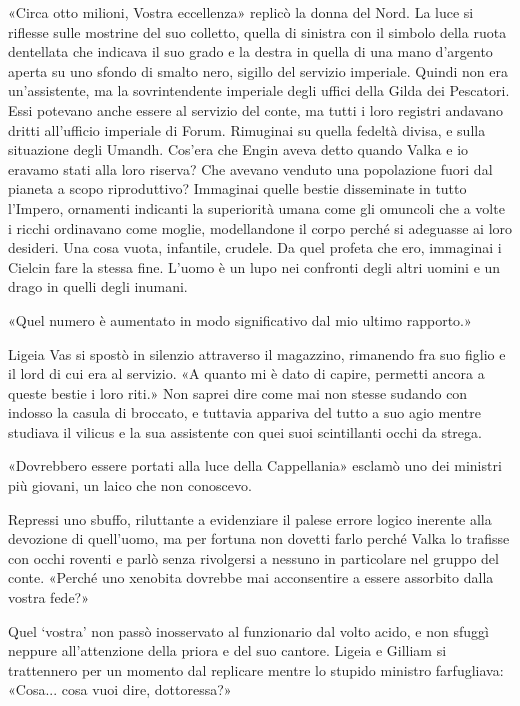 «Circa otto milioni, Vostra eccellenza» replicò la donna del Nord. La
luce si riflesse sulle mostrine del suo colletto, quella di sinistra con
il simbolo della ruota dentellata che indicava il suo grado e la destra
in quella di una mano d'argento aperta su uno sfondo di smalto nero,
sigillo del servizio imperiale. Quindi non era un'assistente, ma la
sovrintendente imperiale degli uffici della Gilda dei Pescatori. Essi
potevano anche essere al servizio del conte, ma tutti i loro registri
andavano dritti all'ufficio imperiale di Forum. Rimuginai su quella
fedeltà divisa, e sulla situazione degli Umandh. Cos'era che Engin aveva
detto quando Valka e io eravamo stati alla loro riserva? Che avevano
venduto una popolazione fuori dal pianeta a scopo riproduttivo?
Immaginai quelle bestie disseminate in tutto l'Impero, ornamenti
indicanti la superiorità umana come gli omuncoli che a volte i ricchi
ordinavano come moglie, modellandone il corpo perché si adeguasse ai
loro desideri. Una cosa vuota, infantile, crudele. Da quel profeta che
ero, immaginai i Cielcin fare la stessa fine. L'uomo è un lupo nei
confronti degli altri uomini e un drago in quelli degli inumani.

«Quel numero è aumentato in modo significativo dal mio ultimo rapporto.»

Ligeia Vas si spostò in silenzio attraverso il magazzino, rimanendo fra
suo figlio e il lord di cui era al servizio. «A quanto mi è dato di
capire, permetti ancora a queste bestie i loro riti.» Non saprei dire
come mai non stesse sudando con indosso la casula di broccato, e
tuttavia appariva del tutto a suo agio mentre studiava il vilicus e la
sua assistente con quei suoi scintillanti occhi da strega.

«Dovrebbero essere portati alla luce della Cappellania» esclamò uno dei
ministri più giovani, un laico che non conoscevo.

Repressi uno sbuffo, riluttante a evidenziare il palese errore logico
inerente alla devozione di quell'uomo, ma per fortuna non dovetti farlo
perché Valka lo trafisse con occhi roventi e parlò senza rivolgersi a
nessuno in particolare nel gruppo del conte. «Perché uno xenobita
dovrebbe mai acconsentire a essere assorbito dalla vostra fede?»

Quel `vostra' \emph{} non passò inosservato al funzionario dal volto
acido, e non sfuggì neppure all'attenzione della priora e del suo
cantore. Ligeia e Gilliam si trattennero per un momento dal replicare
mentre lo stupido ministro farfugliava: «Cosa... cosa vuoi dire,
dottoressa?»

